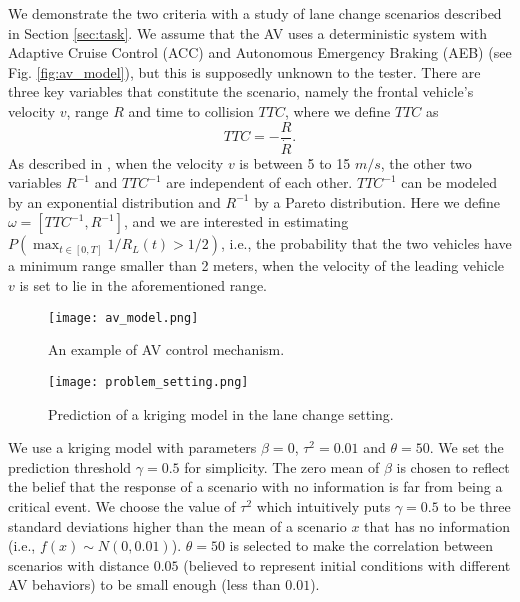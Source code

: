 \documentclass{wscpaperproc}
\theoremstyle{wsc}
\begin{document}
We demonstrate the two criteria with a study of lane change scenarios described in Section \ref{sec:task}. We assume that the AV uses a deterministic system with Adaptive Cruise Control (ACC) and Autonomous Emergency Braking (AEB)  (see Fig. \ref{fig:av_model}), but this is supposedly unknown to the tester. 
There are three key variables that constitute the scenario, namely the frontal vehicle's velocity $v$, range $R$ and time to collision $TTC$, where we define $TTC$ as
\begin{equation*}
	TTC=- \frac{R}{\dot{R}}.
\end{equation*}
As described in , when the velocity $v$ is between 5 to 15 $m/s$, the other two variables $R^{-1}$ and $TTC^{-1}$ are independent of each other.  $TTC^{-1}$ can be modeled by an exponential distribution and $R^{-1}$ by a Pareto distribution. Here we define $\omega=[TTC^{-1},R^{-1}]$, and we are interested in estimating $P(\max_{t\in[0,T]}1/R_L(t)>1/2)$, i.e., the probability that the two vehicles have a minimum range smaller than 2 meters, when the velocity of the leading vehicle $v$ is set to lie in the aforementioned range. 
\begin{figure}[ht]
							\centering
							
							\begin{minipage}[b]{0.4\textwidth}
								\centering
								\texttt{[image: av\_model.png]}
								\caption{An example of AV control mechanism.}
								\label{fig:av_model}
							\end{minipage}
                            \begin{minipage}[b]{0.4\textwidth}
								\centering
                            \texttt{[image: problem\_setting.png]}
	\caption{Prediction of a kriging model in the lane change setting.}
	\label{fig:exp3_set}
							\end{minipage}%
			\end{figure}


We use a kriging model with parameters $\beta=0$, $\tau^2=0.01$ and $\theta=50$. We set the prediction threshold $\gamma=0.5$ for simplicity. The zero mean of $\beta$ is chosen to reflect the belief that the response of a scenario with no information is far from being a critical event. We choose the value of $\tau^2$ which intuitively puts $\gamma=0.5$ to be three standard deviations higher than the mean of a scenario $x$ that has no information (i.e., $f(x) \sim N(0,0.01)$). $\theta=50$ is selected to make the correlation between scenarios with distance $0.05$ (believed to represent initial conditions with different AV behaviors) to be small enough (less than $0.01$). 
\end{document}
